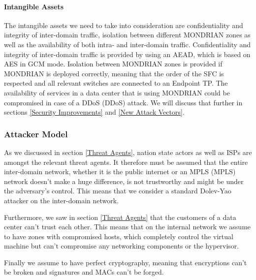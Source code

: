 \paragraph{Intangible Assets}
The intangible assets we need to take into consideration are confidentiality and integrity of inter-domain traffic, isolation between different MONDRIAN zones as well as the availability of both intra- and inter-domain traffic. Confidentiality and integrity of inter-domain traffic is provided by using an \acs{AEAD}, which is based on \acs{AES} in \acs{GCM} mode. Isolation between MONDRIAN zones is provided if MONDRIAN is deployed correctly, meaning that the order of the \acs{SFC} is respected and all relevant switches are connected to an Endpoint \acs{TP}. The availability of services in a data center that is using MONDRIAN could be compromised in case of a \acs{DDoS} (\acl{DDoS}) attack. We will discuss that further in sections \ref{Security Improvements} and \ref{New Attack Vectors}.

\subsubsection{Attacker Model}
As we discussed in section \ref{Threat Agents}, nation state actors as well as \acsp{ISP} are amongst the relevant threat agents. It therefore must be assumed that the entire inter-domain network, whether it is the public internet or an \acs{MPLS} (\acl{MPLS}) network doesn't make a huge difference, is not trustworthy and might be under the adversary's control. This means that we consider a standard Dolev-Yao attacker on the inter-domain network.

Furthermore, we saw in section \ref{Threat Agents} that the customers of a data center can't trust each other. This means that on the internal network we assume to have zones with compromised hosts, which completely control the virtual machine but can't compromise any networking components or the hypervisor.

Finally we assume to have perfect cryptography, meaning that encryptions can't be broken and signatures and \acsp{MAC} can't be forged.

